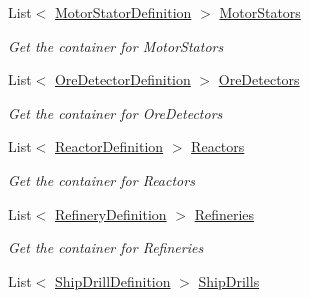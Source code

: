 \begin{DoxyCompactItemize}
List$<$ \hyperlink{class_s_e_mod_a_p_i_1_1_a_p_i_1_1_definitions_1_1_cube_blocks_1_1_motor_stator_definition}{Motor\+Stator\+Definition} $>$ \hyperlink{class_s_e_mod_a_p_i_1_1_a_p_i_1_1_definitions_1_1_cube_blocks_1_1_blocks_manager_aba6d60bf5bbc587c223d0c716b32e307}{Motor\+Stators}
\begin{DoxyCompactList}\small\item\em Get the container for Motor\+Stators \end{DoxyCompactList}\item 
List$<$ \hyperlink{class_s_e_mod_a_p_i_1_1_a_p_i_1_1_definitions_1_1_cube_blocks_1_1_ore_detector_definition}{Ore\+Detector\+Definition} $>$ \hyperlink{class_s_e_mod_a_p_i_1_1_a_p_i_1_1_definitions_1_1_cube_blocks_1_1_blocks_manager_a89671e3572328f46c8fbfe5e205a9680}{Ore\+Detectors}
\begin{DoxyCompactList}\small\item\em Get the container for Ore\+Detectors \end{DoxyCompactList}\item 
List$<$ \hyperlink{class_s_e_mod_a_p_i_1_1_a_p_i_1_1_definitions_1_1_cube_blocks_1_1_reactor_definition}{Reactor\+Definition} $>$ \hyperlink{class_s_e_mod_a_p_i_1_1_a_p_i_1_1_definitions_1_1_cube_blocks_1_1_blocks_manager_ac682f8c246653d92109ff8ea4dc8aca7}{Reactors}
\begin{DoxyCompactList}\small\item\em Get the container for Reactors \end{DoxyCompactList}\item 
List$<$ \hyperlink{class_s_e_mod_a_p_i_1_1_a_p_i_1_1_definitions_1_1_cube_blocks_1_1_refinery_definition}{Refinery\+Definition} $>$ \hyperlink{class_s_e_mod_a_p_i_1_1_a_p_i_1_1_definitions_1_1_cube_blocks_1_1_blocks_manager_a98e2664f605cd6482877d843f7cda5eb}{Refineries}
\begin{DoxyCompactList}\small\item\em Get the container for Refineries \end{DoxyCompactList}\item 
List$<$ \hyperlink{class_s_e_mod_a_p_i_1_1_a_p_i_1_1_definitions_1_1_cube_blocks_1_1_ship_drill_definition}{Ship\+Drill\+Definition} $>$ \hyperlink{class_s_e_mod_a_p_i_1_1_a_p_i_1_1_definitions_1_1_cube_blocks_1_1_blocks_manager_a2eed8e000ea5f2815a3b58676f584358}{Ship\+Drills}

\end{DoxyCompactItemize}

